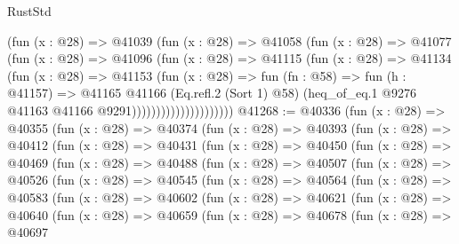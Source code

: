 \begin{lexlean}{RustStd}
\begin{coremodule}
                            (fun (x : @28) =>
                            @41039
                              (fun (x : @28) =>
                              @41058
                                (fun (x : @28) =>
                                @41077
                                  (fun (x : @28) =>
                                  @41096
                                    (fun (x : @28) =>
                                    @41115
                                      (fun (x : @28) =>
                                      @41134
                                        (fun (x : @28) =>
                                        @41153
                                          (fun (x : @28) =>
                                          fun (fn : @58) =>
                                          fun (h : @41157) =>
                                          @41165
                                            @41166
                                            (Eq.refl.{2} (Sort 1) @58)
                                            (heq_of_eq.{1}
                                              @9276
                                              @41163
                                              @41166
                                              @9291)))))))))))))))))))))
@41268 := @40336
    (fun (x : @28) =>
    @40355
      (fun (x : @28) =>
      @40374
        (fun (x : @28) =>
        @40393
          (fun (x : @28) =>
          @40412
            (fun (x : @28) =>
            @40431
              (fun (x : @28) =>
              @40450
                (fun (x : @28) =>
                @40469
                  (fun (x : @28) =>
                  @40488
                    (fun (x : @28) =>
                    @40507
                      (fun (x : @28) =>
                      @40526
                        (fun (x : @28) =>
                        @40545
                          (fun (x : @28) =>
                          @40564
                            (fun (x : @28) =>
                            @40583
                              (fun (x : @28) =>
                              @40602
                                (fun (x : @28) =>
                                @40621
                                  (fun (x : @28) =>
                                  @40640
                                    (fun (x : @28) =>
                                    @40659
                                      (fun (x : @28) =>
                                      @40678
                                        (fun (x : @28) =>
                                        @40697

\end{coremodule}
\end{lexlean}
